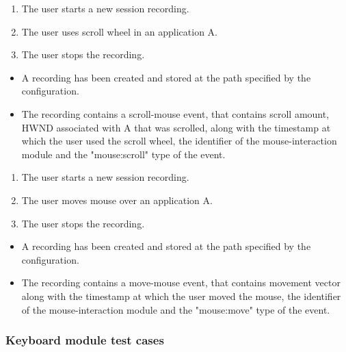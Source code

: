 \begin{tests}
	{\begin{enumerate}
		\item The user starts a new session recording.
		\item The user uses scroll wheel in an application A.
		\item The user stops the recording.
	\end{enumerate}}
	{\begin{itemize}
		\item A recording has been created and stored at the path specified by the configuration.
		\item The recording contains a scroll-mouse event, that contains scroll amount, HWND associated with A that was scrolled, along with the timestamp at which the user used the scroll wheel, the identifier of the mouse-interaction module and the "mouse:scroll" type of the event.
	\end{itemize}}
	
	{\begin{enumerate}
		\item The user starts a new session recording.
		\item The user moves mouse over an application A.
		\item The user stops the recording.
	\end{enumerate}}
	{\begin{itemize}
		\item A recording has been created and stored at the path specified by the configuration.
		\item The recording contains a move-mouse event, that contains movement vector along with the timestamp at which the user moved the mouse, the identifier of the mouse-interaction module and the "mouse:move" type of the event.
	\end{itemize}}
\end{tests}

\subsubsection{Keyboard module test cases}

